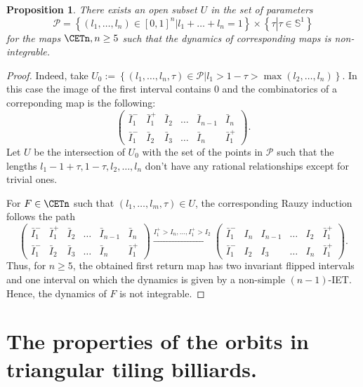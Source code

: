 \documentclass[12pt]{article}
\newtheorem{proposition}{Proposition}
\theoremstyle{definition}
\begin{document}
\begin{proposition}
There exists an open subset $U$ in the set of parameters $$\mathcal{P}=\left\{(l_1, \ldots, l_n) \in [0,1]^n| l_1 + \ldots + l_n=1\right\} \times \left\{ \tau \left| \right. \tau \in \mathbb{S}^1 \right\}$$ for 
the maps $\CETn, n \geq 5$ such that the dynamics of corresponding maps is non-integrable.
\end{proposition}
\begin{proof}
Indeed, take $U_0:=\left\{(l_1, \ldots, l_n, \tau) \in \mathcal{P} \left|\right. l_1 > 1 - \tau > \max (l_2, \ldots, l_n) \right\}$. In this case the image of the first interval contains $0$ and the combinatorics of a correponding map is the following:
\begin{equation*}
\begin{pmatrix}
\bar{I}_{1}^{-}&\bar{I}_1^{+}&\bar{I}_2&\ldots&\bar{I}_{n-1}&\bar{I}_{n} \\
\bar{I}_{1}^{-}&\bar{I}_2&\bar{I}_3&\ldots&\bar{I}_{n}&\bar{I}_1^{+}
\end{pmatrix}.
\end{equation*}
Let $U$ be the intersection of $U_0$ with the set of the points in $\mathcal{P}$ such that the lengths $l_1-1+\tau, 1-\tau, l_2, \ldots, l_n$ don't have any rational relationships except for trivial ones.

For $F \in \CETn$ such that $(l_1, \ldots, l_m, \tau) \in U$, the corresponding Rauzy induction follows the path
\begin{equation*}
\begin{pmatrix}
\bar{I}_{1}^{-}&\bar{I}_1^{+}&\bar{I}_2&\ldots&\bar{I}_{n-1}&\bar{I}_{n} \\
\bar{I}_{1}^{-}&\bar{I}_2&\bar{I}_3&\ldots&\bar{I}_{n}&\bar{I}_1^{+}
\end{pmatrix}
\xrightarrow[]{I_1^+>I_n, \ldots, I_1^+ > I_2} 
\begin{pmatrix}
\bar{I}_{1}^{-}&I_n&{I}_{n-1}&\ldots&I_2&\bar{I}_{1}^{+} \\
\bar{I}_{1}^{-}&{I}_2&{I}_3&\ldots&{I}_{n}&\bar{I}_1^{+}
\end{pmatrix}.
\end{equation*}
Thus, for $n \geq 5$, the obtained first return map has two invariant flipped intervals and one interval on which the dynamics is given by a non-simple $(n-1)$-IET. Hence, the dynamics of $F$ is not integrable.
\end{proof}

\section{The properties of the orbits in triangular tiling billiards.}\label{sec:properties_tiling_billiards}
\end{document}

